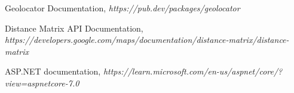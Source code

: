 \begin{thebibliography}{9}
Geolocator Documentation, \newline \textit{https://pub.dev/packages/geolocator}

Distance Matrix API Documentation, \newline \textit{https://developers.google.com/maps/documentation/distance-matrix/distance-matrix}

ASP.NET documentation, \newline \textit{https://learn.microsoft.com/en-us/aspnet/core/?view=aspnetcore-7.0}

\end{thebibliography}
